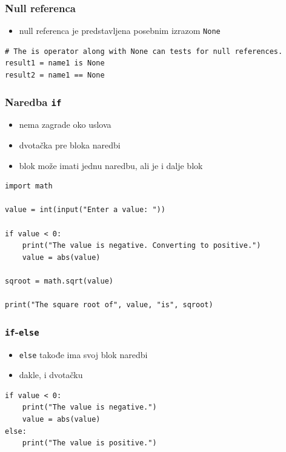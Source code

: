 \documentclass[compress]{beamer}
\begin{document}
\begin{frame}[fragile]
\frametitle{Null referenca}
\begin{itemize}
  \item null referenca je predstavljena posebnim izrazom \texttt{None}
\end{itemize}
\begin{verbatim}
# The is operator along with None can tests for null references.
result1 = name1 is None
result2 = name1 == None
\end{verbatim}
\end{frame}

\begin{frame}[fragile]
\frametitle{Naredba \texttt{if}}
\begin{itemize}
  \item nema zagrade oko uslova
  \item dvotačka pre bloka naredbi
  \item blok može imati jednu naredbu, ali je i dalje blok
\end{itemize}
\begin{verbatim}
import math

value = int(input("Enter a value: "))

if value < 0:
    print("The value is negative. Converting to positive.")
    value = abs(value)

sqroot = math.sqrt(value)

print("The square root of", value, "is", sqroot)
\end{verbatim}
\end{frame}

\begin{frame}[fragile]
\frametitle{\texttt{if}-\texttt{else}}
\begin{itemize}
  \item \texttt{else} takođe ima svoj blok naredbi
  \item dakle, i dvotačku
\end{itemize}
\begin{verbatim}
if value < 0:
    print("The value is negative.")
    value = abs(value)
else:
    print("The value is positive.")
\end{verbatim}
\end{frame}
  
\end{document}
